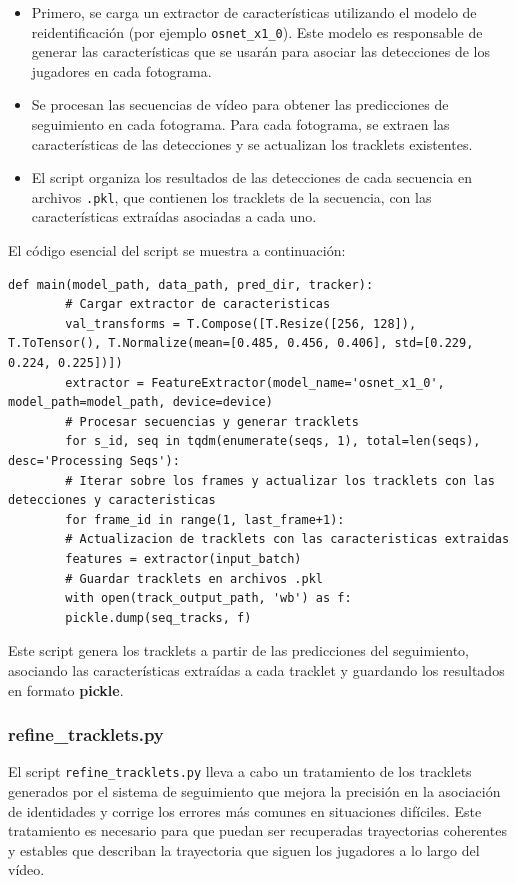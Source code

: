 \documentclass[12pt, a4paper, twoside]{article}
\begin{document}
	\begin{itemize}
		\item Primero, se carga un extractor de características utilizando el modelo de reidentificación (por ejemplo \texttt{osnet\_x1\_0}). Este modelo es responsable de generar las características que se usarán para asociar las detecciones de los jugadores en cada fotograma.
		\item Se procesan las secuencias de vídeo para obtener las predicciones de seguimiento en cada fotograma. Para cada fotograma, se extraen las características de las detecciones y se actualizan los tracklets existentes.
		\item El script organiza los resultados de las detecciones de cada secuencia en archivos \texttt{.pkl}, que contienen los tracklets de la secuencia, con las características extraídas asociadas a cada uno.
	\end{itemize}
	
	El código esencial del script se muestra a continuación:
	\vspace{0.5cm}
	\begin{lstlisting}[style=pythonstyle]
		def main(model_path, data_path, pred_dir, tracker):
		# Cargar extractor de caracteristicas
		val_transforms = T.Compose([T.Resize([256, 128]), T.ToTensor(), T.Normalize(mean=[0.485, 0.456, 0.406], std=[0.229, 0.224, 0.225])])
		extractor = FeatureExtractor(model_name='osnet_x1_0', model_path=model_path, device=device)
		# Procesar secuencias y generar tracklets
		for s_id, seq in tqdm(enumerate(seqs, 1), total=len(seqs), desc='Processing Seqs'):
		# Iterar sobre los frames y actualizar los tracklets con las detecciones y caracteristicas
		for frame_id in range(1, last_frame+1):
		# Actualizacion de tracklets con las caracteristicas extraidas
		features = extractor(input_batch)
		# Guardar tracklets en archivos .pkl
		with open(track_output_path, 'wb') as f:
		pickle.dump(seq_tracks, f)
	\end{lstlisting}
	
	Este script genera los tracklets a partir de las predicciones del seguimiento, asociando las características extraídas a cada tracklet y guardando los resultados en formato \textbf{pickle}.
	
	\subsubsection{refine\_tracklets.py}
	
	El script \texttt{refine\_tracklets.py} lleva a cabo un tratamiento de los tracklets generados por el sistema de seguimiento que mejora la precisión en la asociación de identidades y corrige los errores más comunes en situaciones difíciles. Este tratamiento es necesario para que puedan ser recuperadas trayectorias coherentes y estables que describan la trayectoria que siguen los jugadores a lo largo del vídeo.
	
\end{document}
